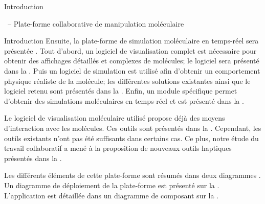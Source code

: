 \documentclass[myfrancais]{mythesis}
\begin{document}
\begin{mypart}{Introduction}
\begin{mychapter}{\myShaddock\ -- Plate-forme collaborative de manipulation moléculaire}
\begin{mysection}{Introduction}
				Ensuite, la plate-forme de simulation moléculaire en temps-réel sera présentée .
				Tout d'abord, un logiciel de visualisation complet est nécessaire pour obtenir des affichages détaillés et complexes de molécules; le logiciel sera présenté dans la .
				Puis un logiciel de simulation est utilisé afin d'obtenir un comportement physique réaliste de la molécule; les différentes solutions existantes ainsi que le logiciel retenu sont présentés dans la .
				Enfin, un module spécifique permet d'obtenir des simulations moléculaires en temps-réel et est présenté dans la .

				Le logiciel de visualisation moléculaire utilisé propose déjà des moyens d'interaction avec les molécules.
				Ces outils sont présentés dans la .
				Cependant, les outils existants n'ont pas été suffisants dans certains cas.
				Ce plus, notre étude du travail collaboratif a mené à la proposition de nouveaux outils haptiques présentés dans la .

				Les différents éléments de cette plate-forme sont résumés dans deux diagrammes .
				Un diagramme de déploiement  de la plate-forme \myShaddock est présenté sur la .
				L'application  est détaillée dans un diagramme de composant  sur la .


\end{mysection}
\end{mychapter}
\end{mypart}
\end{document}
